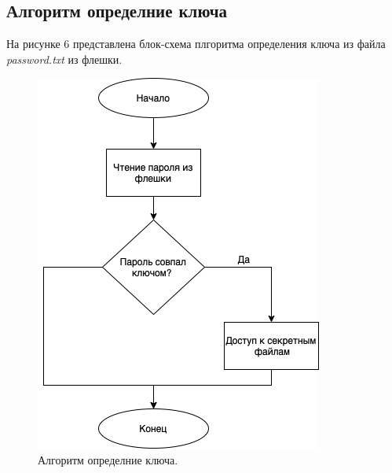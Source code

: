 \documentclass[a4paper, 10pt]{article}
\begin{document}
	\subsection{Алгоритм определние ключа}
	На рисунке 6 представлена блок-схема плгоритма определения ключа из файла \textit{password.txt} из флешки. 
	\begin{figure}[h!]
		\centering
		\includegraphics[scale=0.48]{passwoord}
		\centering\caption{Алгоритм определние ключа.}
	\end{figure}
\end{document}
